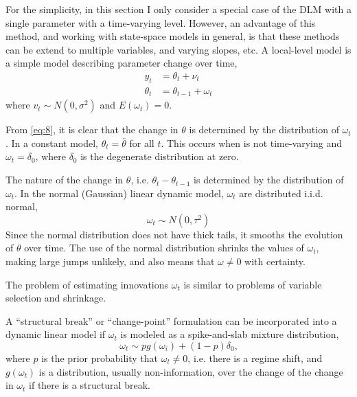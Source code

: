 \documentclass{article}
\begin{document}
For the simplicity, in this section I only consider a special case of the DLM with a single parameter with a time-varying level. 
However, an advantage of this method, and working with state-space models in general, is that these methods can be extend to multiple variables, and varying slopes, etc.
A local-level model is a simple model describing parameter change over time,
\begin{equation}
  \label{eq:8}
  \begin{aligned}
    y_t &= \theta_t + \nu_t \\
    \theta_t &= \theta_{t-1} + \omega_t
  \end{aligned}
\end{equation}
where $v_{t} \sim N(0, \sigma^{2})$ and $E(\omega_t) = 0$.  

From \eqref{eq:8}, it is clear that the change in $\theta$ is determined by the distribution of $\omega_{t}$.
In a constant model, $\theta_{t} = \bar{\theta}$ for all $t$. 
This occurs when is not time-varying and $\omega_{t} = \delta_{0}$, where $\delta_{0}$ is the degenerate distribution at zero.

The nature of the change in $\theta$, i.e. $\theta_{t} - \theta_{t-1}$ is determined by the distribution of $\omega_t$.  
In the normal (Gaussian) linear dynamic model, $\omega_{t}$ are distributed i.i.d. normal,
\begin{equation}
  \label{eq:2}
  \omega_{t} \sim N(0, \tau^{2})
\end{equation}
Since the normal distribution does not have thick tails, it smooths the evolution of $\theta$ over time.
The use of the normal distribution shrinks the values of $\omega_{t}$, making large jumps unlikely, 
and also means that $\omega \neq 0$ with certainty.

The problem of estimating innovations $\omega_{t}$ is similar to problems of variable selection and shrinkage.

A ``structural break'' or ``change-point'' formulation can be incorporated into a dynamic linear model if $\omega_{t}$ is modeled as a spike-and-slab mixture distribution,
\begin{equation}
  \label{eq:1}
  \omega_{t} \sim p g(\omega_{i}) + (1 - p) \delta_{0} \text{,}
\end{equation}
where $p$ is the prior probability that $\omega_{t} \neq 0$, i.e. there is a regime shift, and 
$g(\omega_{t})$ is a distribution, usually non-information, over the change of the change in $\omega_{t}$ if there is a structural break.
\end{document}
